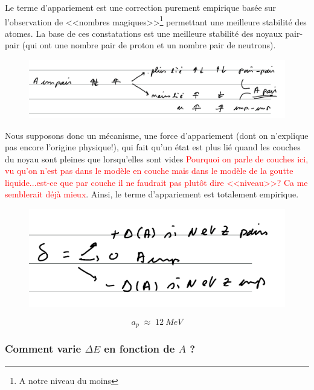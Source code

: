 Le terme d'appariement est une correction purement empirique basée sur l'observation de <<nombres magiques>>\footnote{A notre niveau du moins} permettant une meilleure stabilité des atomes. La base de ces constatations est une meilleure stabilité des noyaux pair-pair (qui ont une nombre pair de proton et un nombre pair de neutrons).\\
\begin{figure}[ht]
    \centering
    \includegraphics[width=\textwidth]{Images4/appariement.PNG}
\end{figure}

Nous supposons donc un mécanisme, une force d'appariement (dont on n'explique pas encore l'origine physique!), qui fait qu'un état est plus lié quand les couches du noyau sont pleines que lorsqu'elles sont vides \textcolor{red}{Pourquoi on parle de couches ici, vu qu'on n'est pas dans le modèle en couche mais dans le modèle de la goutte liquide...est-ce que par couche il ne faudrait pas plutôt dire <<niveau>>? Ca me semblerait déjà mieux}. Ainsi, le terme d'appariement est totalement empirique.\\
\begin{figure}[htp]
    \centering
    \includegraphics{Images4/appariement2.PNG}
\end{figure}
\[
    a_p \; \approx \; \SI{12}{MeV}
\]



\subsubsection{Comment varie $\Delta E$ en fonction de $A$ ?} 


